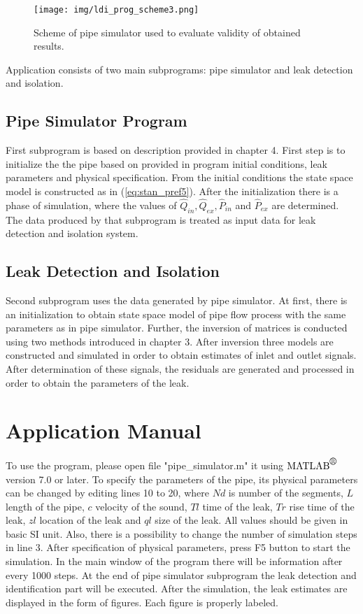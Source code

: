 \begin{figure}[ht]
   \centering
   \texttt{[image: img/ldi\_prog\_scheme3.png]}
   \caption{Scheme of pipe simulator used to evaluate validity of obtained results.}
\label{fig:appl_scheme}
\end{figure}

Application consists of two main subprograms: pipe simulator and leak detection and isolation.

\subsection{Pipe Simulator Program}

First subprogram is based on description provided in chapter 4. First step is to initialize the the pipe based on provided in program initial conditions, leak parameters and physical specification. From the initial conditions the state space model is constructed as in (\ref{eq:stan_pref5}). After the initialization there is a phase of simulation, where the values of $\hat{Q}_{in}, \hat{Q}_{ex}, \hat{P}_{in}$ and $\hat{P}_{ex}$ are determined. The data produced by that subprogram is treated as input data for leak detection and isolation system.

\subsection{Leak Detection and Isolation}

Second subprogram uses the data generated by pipe simulator. At first, there is an initialization to obtain state space model of pipe flow process with the same parameters as in pipe simulator. Further, the inversion of matrices is conducted using two methods introduced in chapter 3. After inversion three models are constructed and simulated in order to obtain estimates of inlet and outlet signals. After determination of these signals, the residuals are generated and processed in order to obtain the parameters of the leak.

\section{Application Manual}

To use the program, please open file "pipe\_simulator.m" it using $\mbox{MATLAB}^{\mbox{\textregistered}}$ version 7.0 or later. To specify the parameters of the pipe, its physical parameters can be changed by editing lines 10 to 20, where $Nd$ is number of the segments, $L$ length of the pipe, $c$ velocity of the sound, $Tl$ time of the leak, $Tr$ rise time of the leak, $zl$ location of the leak and $ql$ size of the leak. All values should be given in basic SI unit. Also, there is a possibility to change the number of simulation steps in line 3. After specification of physical parameters, press F5 button to start the simulation. In the main window of the program there will be information after every 1000 steps. At the end of pipe simulator subprogram the leak detection and identification part will be executed. After the simulation, the leak estimates are displayed in the form of figures. Each figure is properly labeled.

